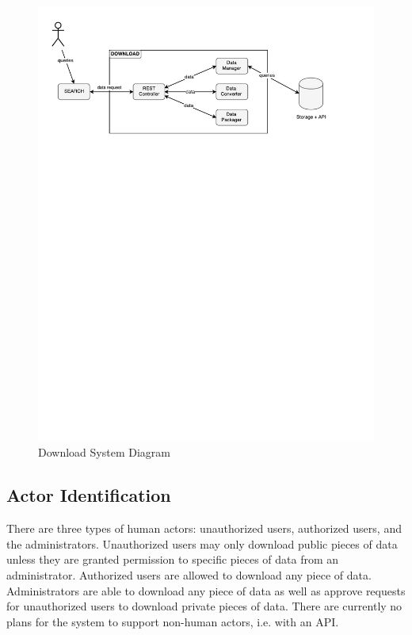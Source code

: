 \documentclass{article}
\begin{document}
	\begin{figure}[H]
		\begin{center}
			\caption{Download System Diagram}
			\includegraphics[width=\textwidth]{images/component.pdf}
		\end{center}
	\end{figure}
	
	\clearpage
	
	\subsection{Actor Identification}
	
	There are three types of human actors: unauthorized users, authorized users, and the administrators. Unauthorized users may only download public pieces of data unless they are granted permission to specific pieces of data from an administrator. Authorized users are allowed to download any piece of data. Administrators are able to download any piece of data as well as approve requests for unauthorized users to download private pieces of data. There are currently no plans for the system to support non-human actors, i.e. with an API. 
	
\end{document}
